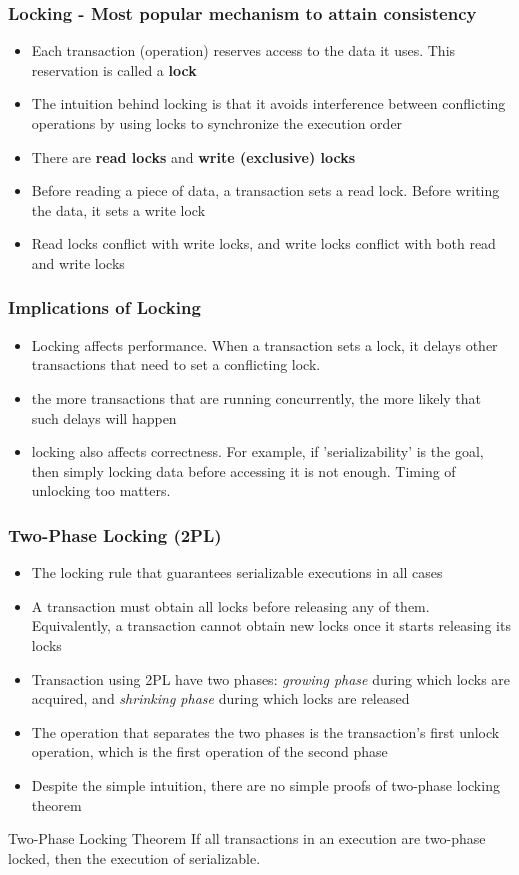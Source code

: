 \documentclass[12]{beamer}
\begin{document}
\begin{frame}
  \frametitle{Locking - Most popular mechanism to attain consistency}
  \begin{itemize}
    \item Each transaction (operation) reserves access to the data it uses. This reservation is called a \textbf{lock}
    \item The intuition behind locking is that it avoids interference between conflicting operations by using locks to synchronize the execution order
    \item There are \textbf{read locks} and \textbf{write (exclusive) locks}
    \item Before reading a piece of data, a transaction sets a read lock. Before writing the data, it sets a write lock
    \item Read locks conflict with write locks, and write locks conflict with both read and write locks
  \end{itemize}
\end{frame}

\begin{frame}
  \frametitle{Implications of Locking}
  \begin{itemize}
    \item  Locking affects performance. When a transaction sets a lock, it delays other transactions that need to set a conflicting lock.
    \item the more transactions that are running concurrently, the more likely that such delays will happen
    \item locking also affects correctness. For example, if 'serializability' is the goal, then simply locking data before accessing it is not enough. Timing of unlocking too matters.
  \end{itemize}
\end{frame}

\begin{frame}
  \frametitle{Two-Phase Locking (2PL) }
  \begin{itemize}
  \item The locking rule that guarantees serializable executions in all cases
  \item A transaction must obtain all locks before releasing any of them. Equivalently, a transaction cannot obtain new locks once it starts releasing its locks
  \item Transaction using 2PL have two phases: \textit{growing phase} during which locks are acquired, and \textit{shrinking phase} during which locks are released
  \item The operation that separates the two phases is the transaction's first unlock operation, which is the first operation of the second phase
  \item Despite the simple intuition, there are no simple proofs of two-phase locking theorem
  \end{itemize}
   \begin{block}{Two-Phase Locking Theorem}
     If all transactions in an execution are two-phase locked, then the execution of serializable.
  \end{block}
\end{frame}
\end{document}
